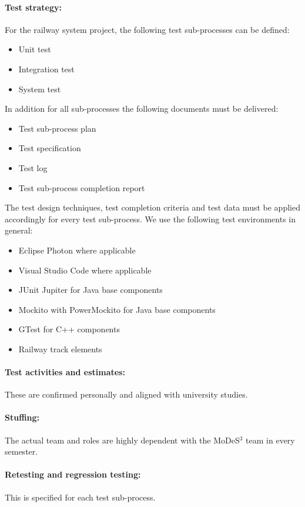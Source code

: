 \paragraph{Test strategy:} 
For the railway system project, the following test sub-processes can be defined:
\begin{itemize}
	\item Unit test
	\item Integration test
	\item System test
\end{itemize}
In addition for all sub-processes the following documents must be delivered:
\begin{itemize}
	\item Test sub-process plan
	\item Test specification
	\item Test log
	\item Test sub-process completion report
\end{itemize}
The test design techniques, test completion criteria and test data must be applied accordingly for every test sub-process. We use the following test environments in general:
\begin{itemize}
	\item Eclipse Photon where applicable
	\item Visual Studio Code where applicable
	\item JUnit Jupiter for Java base components
	\item Mockito with PowerMockito for Java base components
	\item GTest for C++ components
	\item Railway track elements
\end{itemize}
\paragraph{Test activities and estimates:} These are confirmed personally and aligned with university studies.
\paragraph{Stuffing:} The actual team and roles are highly dependent with the MoDeS$^3$ team in every semester.
\paragraph{Retesting and regression testing:} This is specified for each test sub-process. 



